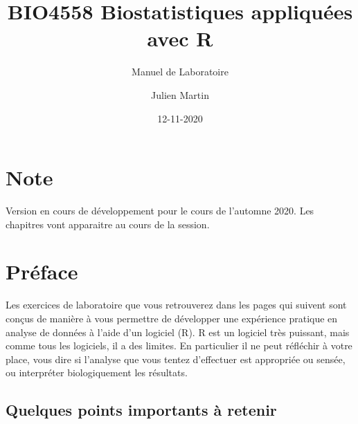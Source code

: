 \documentclass[12pt,]{book}
\title{BIO4558 Biostatistiques appliquées avec R}
\subtitle{Manuel de Laboratoire}
\author{Julien Martin}
\date{12-11-2020}
\begin{document}
\maketitle



{
\setcounter{tocdepth}{1}
\tableofcontents
}
\hypertarget{note}{%
\chapter*{Note}\label{note}}

Version en cours de développement pour le cours de l'automne 2020. Les chapitres vont apparaitre au cours de la session.

\hypertarget{pruxe9face}{%
\chapter*{Préface}\label{pruxe9face}}

Les exercices de laboratoire que vous retrouverez dans les pages qui suivent sont conçus de manière à vous permettre de développer une expérience pratique en analyse de données à l'aide d'un logiciel (R).
R est un logiciel très puissant, mais comme tous les logiciels, il a des limites.
En particulier il ne peut réfléchir à votre place, vous dire si l'analyse que vous tentez d'effectuer est appropriée ou sensée, ou interpréter biologiquement les résultats.

\hypertarget{quelques-points-importants-uxe0-retenir}{%
\section*{Quelques points importants à retenir}\label{quelques-points-importants-uxe0-retenir}}
\end{document}
